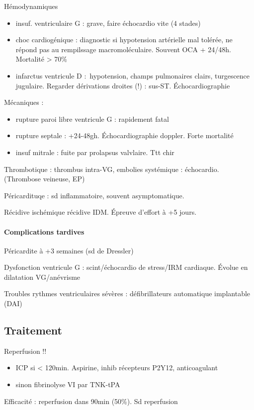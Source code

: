 Hémodynamiques
\begin{itemize}
  \item insuf. ventriculaire G : grave, faire échocardio vite (4 stades)
  \item choc cardiogénique : diagnostic si hypotension artérielle mal tolérée,
    ne répond pas au rempilssage macromoléculaire. Souvent OCA + 24/48h.
    Mortalité > 70\%
  \item infarctus ventricule D : hypotension, champs pulmonaires clairs,
    turgescence jugulaire. Regarder dérivations droites (!) : sus-ST.
    Échocardiographie
\end{itemize}
Mécaniques :
\begin{itemize}
  \item rupture paroi libre ventricule G : rapidement fatal
  \item rupture septale : +24-48gh. Échocardiographie doppler. Forte mortalité
  \item insuf mitrale : fuite par prolapsus valvlaire. Ttt chir
\end{itemize}
Thrombotique : thrombus intra-VG, embolies systémique : échocardio. (Thrombose
veineuse, EP)

Péricardituqe : sd inflammatoire, souvent asymptomatique.

Récidive ischémique \thus récidive IDM. Épreuve d'effort à  +5 jours.

\paragraph{Complications tardives}
Péricardite à +3 semaines (sd de Dressler)

Dysfonction ventricule G : scint/échocardio de stress/IRM cardiaque. Évolue en
dilatation VG/anévrisme

Troubles rythmes ventriculaires sévères : défibrillateurs automatique
implantable (DAI)

\subsection{Traitement}
Reperfusion !!
\begin{itemize}
  \item ICP si < 120min. Aspirine, inhib récepteurs P2Y12, anticoagulant
  \item sinon fibrinolyse VI par TNK-tPA
\end{itemize}
Efficacité : reperfusion dans 90min (50\%). Sd reperfusion

